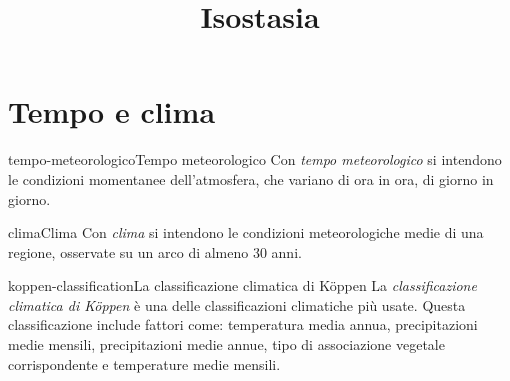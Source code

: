 \documentclass[preview]{standalone}
\begin{document}
\title{Isostasia}
\genpage

\section{Tempo e clima}

\begin{snippetdefinition}{tempo-meteorologico}{Tempo meteorologico}
    Con \textit{tempo meteorologico}
    si intendono le condizioni momentanee
    dell'atmosfera, che variano di ora
    in ora, di giorno in giorno.
\end{snippetdefinition}

\begin{snippetdefinition}{clima}{Clima}
    Con \textit{clima}
    si intendono le condizioni meteorologiche
    medie di una regione, osservate
    su un arco di almeno 30 anni.
\end{snippetdefinition}

\begin{snippetdefinition}{koppen-classification}{La classificazione climatica di Köppen}
    La \textit{classificazione climatica di Köppen} è una delle classificazioni climatiche più usate.
    Questa classificazione include fattori come: temperatura media annua, precipitazioni medie mensili,
    precipitazioni medie annue, tipo di associazione vegetale corrispondente e temperature medie mensili.
\end{snippetdefinition}
\end{document}

